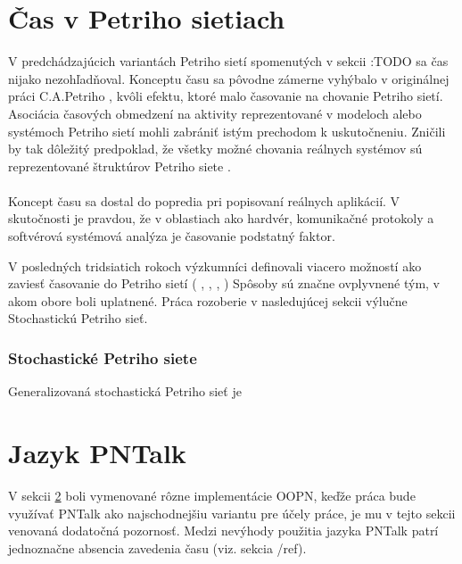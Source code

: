 \section{Čas v Petriho sietiach}

V predchádzajúcich variantách Petriho sietí spomenutých v sekcii :TODO sa čas nijako nezohľadňoval. Konceptu času sa pôvodne zámerne vyhýbalo v originálnej práci C.A.Petriho \cite{petri1966communication}, kvôli efektu, ktoré malo časovanie na chovanie Petriho sietí. Asociácia časových obmedzení na aktivity reprezentované v modeloch alebo systémoch Petriho sietí mohli zabrániť istým prechodom k uskutočneniu. Zničili by tak dôležitý predpoklad, že všetky možné chovania reálnych systémov sú reprezentované štruktúrov Petriho siete \cite{marsan1995modelling}. \\\\
Koncept času sa dostal do popredia pri popisovaní reálnych aplikácií. V skutočnosti je pravdou, že v oblastiach ako hardvér, komunikačné protokoly a softvérová systémová analýza je časovanie podstatný faktor.

V posledných tridsiatich rokoch výzkumníci definovali viacero možností ako zaviesť časovanie do Petriho sietí ( \cite{Ramchandani1974}, \cite{Holliday1987}, \cite{Ramamoorthy1980}, \cite{Merlin1976})  Spôsoby sú značne ovplyvnené tým, v akom obore boli uplatnené.
Práca rozoberie v nasledujúcej sekcii výlučne Stochastickú Petriho sieť.



\subsubsection{Stochastické Petriho siete}
Generalizovaná stochastická Petriho sieť je 


\section{Jazyk PNTalk}

V sekcii \ref{} boli vymenované rôzne implementácie OOPN, keďže práca bude využívať PNTalk ako najschodnejšiu variantu pre účely práce, je mu v tejto sekcii venovaná dodatočná pozornosť. Medzi nevýhody použitia jazyka PNTalk patrí jednoznačne absencia zavedenia času (viz. sekcia /ref{}).


